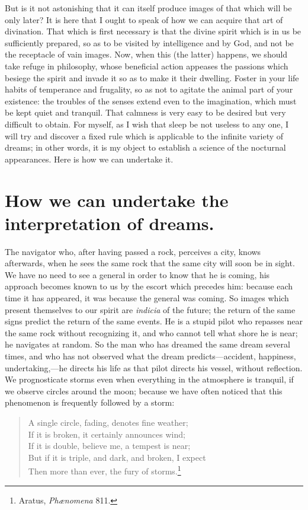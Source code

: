 \documentclass[12pt]{article}
\begin{document}
But is it not astonishing that it can itself produce images of that which will
be only later? It is here that I ought to speak of how we can acquire that art
of divination. That which is first necessary is that the divine spirit which is
in us be sufficiently prepared, so as to be visited by intelligence and by God,
and not be the receptacle of vain images. Now, when this (the latter) happens,
we should take refuge in philosophy, whose beneficial action appeases the
passions which besiege the spirit and invade it so as to make it their
dwelling. Foster in your life habits of temperance and frugality, so as not to
agitate the animal part of your existence: the troubles of the senses extend
even to the imagination, which must be kept quiet and tranquil. That calmness
is very easy to be desired but very difficult to obtain. For myself, as I wish
that sleep be not useless to any one, I will try and discover a fixed rule
which is applicable to the infinite variety of dreams; in other words, it is my
object to establish a science of the nocturnal appearances. Here is how we can
undertake it.


\section{How we can undertake the interpretation of dreams.}

The navigator who, after having passed a rock, perceives a city, knows
afterwards, when he sees the same rock that the same city will soon be in
sight. We have no need to see a general in order to know that he is coming, his
approach becomes known to us by the escort which precedes him: because each
time it has appeared, it was because the general was coming. So images which
present themselves to our spirit are \textit{indicia} of the future; the
return of the same signs predict the return of the same events. He is a stupid
pilot who repasses near the same rock without recognizing it, and who cannot
tell what shore he is near; he navigates at random. So the man who has dreamed
the same dream several times, and who has not observed what the dream
predicts---accident, happiness, undertaking,---he directs his life as that pilot
directs his vessel, without reflection. We prognosticate storms even when
everything in the atmosphere is tranquil, if we observe circles around the
moon; because we have often noticed that this phenomenon is frequently followed
by a storm:

\begin{verse}
A single circle, fading, denotes fine weather;\\
If it is broken, it certainly announces wind;\\
If it is double, believe me, a tempest is near;\\
But if it is triple, and dark, and broken, I expect\\
Then more than ever, the fury of storms.\footnote{Aratus,
\textit{Ph{\ae}nomena} 811.}
\end{verse}
\end{document}
